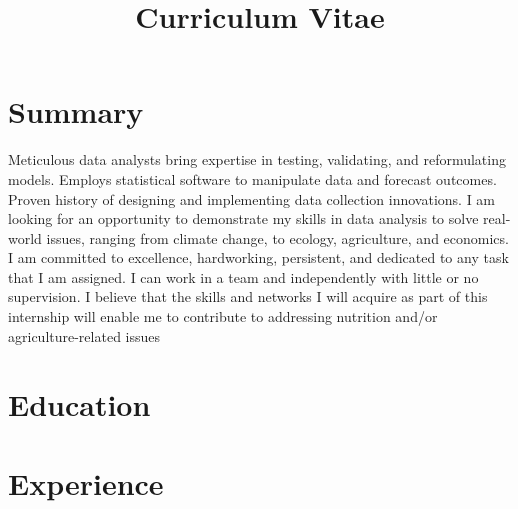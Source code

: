 \documentclass[11pt,a4paper,sans]{moderncv} %
\title{Curriculum Vitae}
\begin{document}

\makecvtitle %
\section{Summary}

Meticulous data analysts bring expertise in testing, validating, and reformulating models. Employs statistical software to manipulate data and forecast outcomes. Proven history of designing and implementing data collection innovations. I am looking for an opportunity to demonstrate my skills in data analysis to solve real-world issues, ranging from climate change, to ecology, agriculture, and economics. I am committed to excellence, hardworking, persistent, and dedicated to any task that I am assigned. I can work in a team and independently with little or no supervision. I believe that the skills and networks I will acquire as part of this internship will enable me to contribute to addressing nutrition and/or agriculture-related issues


\section{Education}






\section{Experience}
\end{document}
